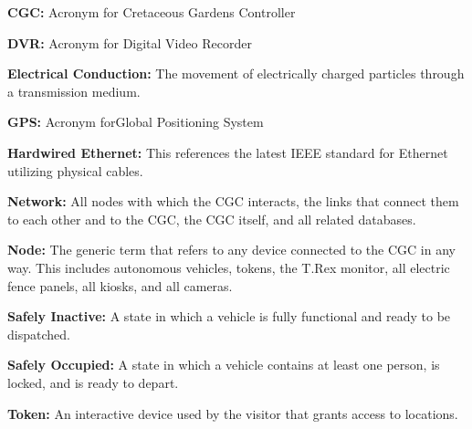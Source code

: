 \documentclass[12pt]{article}
\begin{document}
	\begin{list}{}{}
	\item \textbf{CGC:} Acronym for Cretaceous Gardens Controller 
	\item \textbf{DVR:} Acronym for Digital Video Recorder
	\item \textbf{Electrical Conduction:} The movement of electrically charged particles through a transmission medium.
	\item \textbf{GPS:} Acronym forGlobal Positioning System 
	\item \textbf{Hardwired Ethernet:} This references the latest IEEE standard for Ethernet utilizing physical cables.
	\item \textbf{Network:} All nodes with which the CGC interacts, the links that connect them to each other and to the
	CGC, the CGC itself, and all related databases.
	\item \textbf{Node:} The generic term that refers to any device connected to the CGC in any way. This includes 
	autonomous vehicles, tokens, the T.Rex monitor, all electric fence panels, all kiosks, and all cameras.
	\item \textbf{Safely Inactive:} A state in which a vehicle is fully functional and ready to be dispatched.
	\item \textbf{Safely Occupied:} A state in which a vehicle contains at least one person, is locked, and is ready to depart.
	\item \textbf{Token:} An interactive device used by the visitor that grants access to locations.
	\end{list}


\pagebreak
\end{document}

